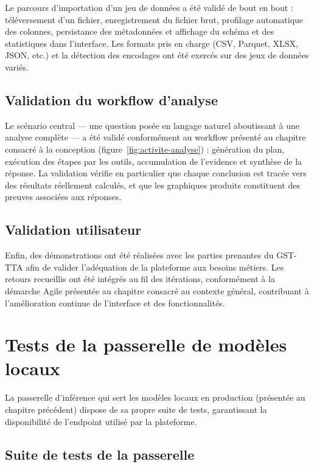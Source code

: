 Le parcours d'importation d'un jeu de données a été validé de bout en bout : téléversement d'un fichier, enregistrement du fichier brut, profilage automatique des colonnes, persistance des métadonnées et affichage du schéma et des statistiques dans l'interface. Les formats pris en charge (CSV, Parquet, XLSX, JSON, etc.) et la détection des encodages ont été exercés sur des jeux de données variés.

\subsection{Validation du workflow d'analyse}

Le scénario central — une question posée en langage naturel aboutissant à une analyse complète — a été validé conformément au workflow présenté au chapitre consacré à la conception (figure~\ref{fig:activite-analyse}) : génération du plan, exécution des étapes par les outils, accumulation de l'evidence et synthèse de la réponse. La validation vérifie en particulier que chaque conclusion est tracée vers des résultats réellement calculés, et que les graphiques produits constituent des preuves associées aux réponses.

\subsection{Validation utilisateur}

Enfin, des démonstrations ont été réalisées avec les parties prenantes du GST-TTA afin de valider l'adéquation de la plateforme aux besoins métiers. Les retours recueillis ont été intégrés au fil des itérations, conformément à la démarche Agile présentée au chapitre consacré au contexte général, contribuant à l'amélioration continue de l'interface et des fonctionnalités.

\section{Tests de la passerelle de modèles locaux}

La passerelle d'inférence qui sert les modèles locaux en production (présentée au chapitre précédent) dispose de sa propre suite de tests, garantissant la disponibilité de l'endpoint utilisé par la plateforme.

\subsection{Suite de tests de la passerelle}

